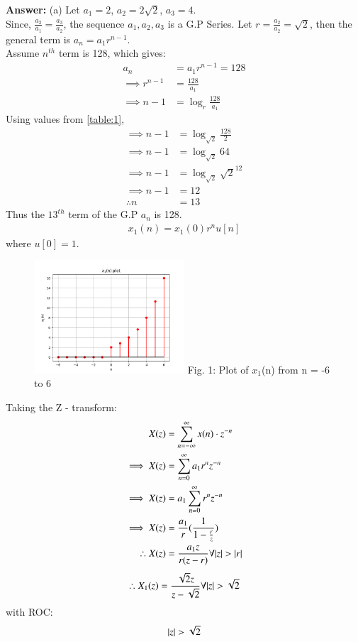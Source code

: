 \documentclass[journal,12pt,twocolumn]{IEEEtran}
\theoremstyle{remark}
\begin{document}
\textbf{Answer:} (a) Let $a_1 = 2$, $a_2 = 2\sqrt{2}$, $a_3 = 4$.\\
Since, $\frac{a_2}{a_1} = \frac{a_3}{a_2}$, the sequence $a_1, a_2, a_3$ is a G.P Series.
Let $r = \frac{a_2}{a_2} = \sqrt{2}$, then the general term is $a_n = a_1 r^{n-1}$.\\
Assume $n^{th}$ term is 128, which gives: 
\begin{align}
    a_n &= a_1 r^{n-1} = 128\\
    \implies r^{n-1} &= \frac{128}{a_1}\\
    \implies n - 1 &= \log_{r}{\frac{128}{a_1}}
\end{align}
Using values from \ref{table:1},
\begin{align}
    \implies n - 1 &= \log_{\sqrt{2}}{\frac{128}{2}}\\
    \implies n - 1 &= \log_{\sqrt{2}}{64}\\
    \implies n - 1 &= \log_{\sqrt{2}}{\sqrt{2}^{12}}\\
    \implies n - 1 &= 12\\
    \therefore n &= 13
\end{align}
Thus the $13^{th}$ term of the G.P $a_n$ is 128.\\ 
\begin{align} x_1(n) = x_1(0)r^{n}u[n] \end{align} where $u[0] = 1$.
\begin{figure}[h!]
    \centering
    \includegraphics[width=0.5\textwidth]{figs/a.png}
    Fig. 1: Plot of $x_1$(n) from n = -6 to 6
    \label{fig:img1}
\end{figure}
Taking the Z - transform:
\begin{align}
    X(z) &= \sum_{n = -\infty}^{\infty}{x(n) \cdot z^{-n}}\\
    \implies X(z) &= \sum_{n = 0}^{\infty}{a_1r^{n}z^{-n}}\\
    \implies X(z) &= a_1\sum_{n = 0}^{\infty}{r^n z^{-n}}\\
    \implies X(z) &= \frac{a_1}{r}(\frac{1}{1 - \frac{r}{z}})\\
    \therefore X(z) &= \frac{a_1z}{r(z - r)} \forall {\left\vert z\right\vert > \left\vert r\right\vert} \label{zresult}
\end{align}
\begin{align}
    \therefore X_1(z) = \frac{\sqrt{2}z}{z - \sqrt{2}}\forall {\left\vert z\right\vert > \sqrt{2}}
\end{align}
with ROC: \[ \left\vert z\right\vert > \sqrt{2} \]
\end{document}
